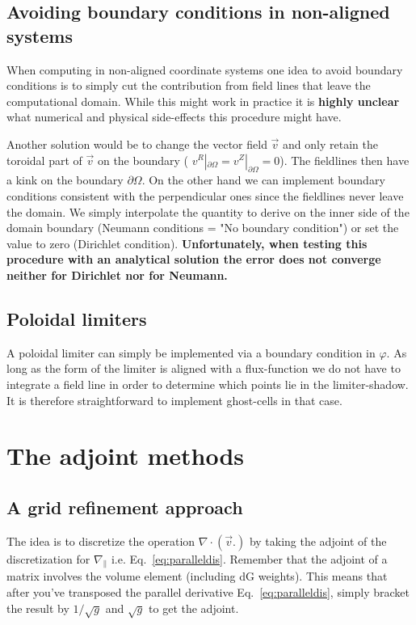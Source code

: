 \subsection{Avoiding boundary conditions in non-aligned systems} \label{sec:avoid}

When computing in non-aligned coordinate systems
one idea to avoid boundary conditions
is to simply cut the contribution from field lines
that leave the computational domain. While this might work in practice
it is \textbf{highly unclear} what numerical and physical side-effects this procedure might have.

Another solution would be to change the
vector field $\vec v$ and only retain the toroidal part of $\vec v$ on the
boundary ( $v^R|_{\partial\Omega} = v^Z|_{\partial\Omega} =0$). The fieldlines then have a kink on the boundary $\partial\Omega$.
On the other hand we can implement boundary conditions consistent with
the perpendicular ones since the fieldlines never leave the domain.
We simply interpolate the quantity to derive on the inner side of the
domain boundary (Neumann conditions = "No boundary condition") or
set the value to zero (Dirichlet condition).
\textbf{Unfortunately, when testing this procedure with an analytical solution
the error does not converge neither for Dirichlet nor for Neumann.}

\subsection{Poloidal limiters}
A poloidal limiter can simply be implemented via a boundary condition in $\varphi$.
As long as the form of the limiter is aligned with a flux-function we do not have to
integrate a field line in order to determine which points lie in the
limiter-shadow. It is therefore straightforward to implement ghost-cells
in that case.


\section{The adjoint methods}
\subsection{A grid refinement approach}
The idea is to discretize the operation $\nabla\cdot( \vec v .)$ by
taking the adjoint of the discretization for $\nabla_\parallel$ i.e. Eq.~\eqref{eq:paralleldis}.
Remember that the adjoint of a matrix
involves the volume element (including dG weights). This means that after you've transposed the
parallel derivative Eq.~\eqref{eq:paralleldis}, simply bracket the result
by $1/\sqrt{g}$ and $\sqrt{g}$ to get the adjoint.

